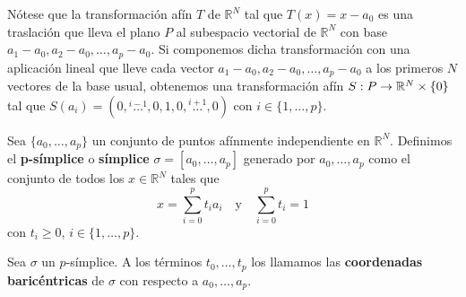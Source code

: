 Nótese que la transformación afín $T$ de $\mathbb{R}^N$ tal que $T(x) = x - a_0$ es una traslación que lleva el plano $P$ al subespacio vectorial de $\mathbb{R}^N$ con base $a_1-a_0, a_2-a_0, \dots, a_p-a_0$. Si componemos dicha transformación con una aplicación lineal que lleve cada vector $a_1-a_0, a_2-a_0, \dots, a_p-a_0$ a los primeros $N$ vectores de la base usual, obtenemos una transformación afín $S: P \rightarrow \mathbb{R}^N \times \{0\}$ tal que $S(a_i) = (0, \overset{i-1}{\dots}, 0, 1, 0, \overset{i+1}{\dots}, 0)$ con $i \in \{1, \dots, p\}$.

\begin{definicion}
	Sea $\{a_0, \dots, a_p\}$ un conjunto de puntos afínmente independiente en 
	$\mathbb{R}^N$. Definimos el \textbf{p-símplice} o \textbf{símplice} $\sigma = [a_0, \dots, a_p]$ 
	generado por $a_0, 	\dots, a_p$ como el conjunto de todos los $x \in \mathbb{R}^N$ 
	tales que
	\[ x=\sum_{i=0}^{p}t_ia_i \quad \text{y} \quad \sum_{i=0}^{p}t_i=1 \]
	con $t_i \geq 0$, $i \in \{1, \dots, p\}$.
\end{definicion}
\begin{definicion}
	Sea $\sigma$ un $p$-símplice. A los términos $t_0, \dots, t_p$ los llamamos las \textbf{coordenadas baricéntricas} de $\sigma$
	con respecto a $a_0, \dots, a_p$.
\end{definicion}

